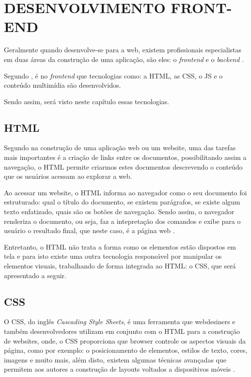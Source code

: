 \section{DESENVOLVIMENTO FRONT-END}

Geralmente quando desenvolve-se para a web, existem profissionais especialistas
em duas áreas da construção de uma aplicação, são eles: o \textit{frontend} e o
\textit{backend} \cite{artigoAvaliacaoEReducaoDoTempoDeRespostaDeSistemasWeb}.

Segundo , é no
\textit{frontend} que tecnologias como: a \ac{HTML}, as \ac{CSS}, o \ac{JS}
e o conteúdo multimídia são desenvolvidos.

Sendo assim, será visto neste capítulo essas tecnologias.

\subsection{HTML}

Segundo  na construção de uma aplicação web ou
um website, uma das tarefas mais importantes é a criação de links entre os
documentos, possibilitando assim a navegação, o \acs{HTML} permite criarmos
estes documentos descrevendo o conteúdo que os usuários acessam ao explorar a web.

Ao acessar um website, o \acs{HTML} informa ao navegador como o seu documento
foi estruturado: qual o título do documento, se existem parágrafos, se existe
algum texto enfatizado, quais são os botões de navegação. Sendo assim, o
navegador renderiza o documento, ou seja, faz a intepretação dos
comandos e exibe para o usuário o resultado final, que neste caso, é a página
web \cite{headFirstHTMLWithCSSAndXHTML}.

Entretanto, o \acs{HTML} não trata a forma como os elementos estão dispostos em
tela e para isto existe uma outra tecnologia responsável por manipular os
elementos visuais, trabalhando de forma integrada ao \acs{HTML}:
o \acs{CSS}, que será apresentado a seguir.

\subsection{CSS}

O \ac{CSS}, do inglês \textit{Cascading Style Sheets}, é uma ferramenta
que webdesiners e também desenvolvedores utilizam em conjunto com o \ac{HTML}
para a construção de websites, onde, o \acs{CSS} proporciona que \ac{browser}
controle os aspectos visuais da página, como por exemplo: o posicionamento de elementos,
estilos de texto, cores, imagens e muito mais, além disto, existem algumas
técnicas avançadas que permitem aos autores a construção de layouts voltados a
dispositivos móveis \cite{beginningCSSCascadingStyleSheetsForWebDesign}.


